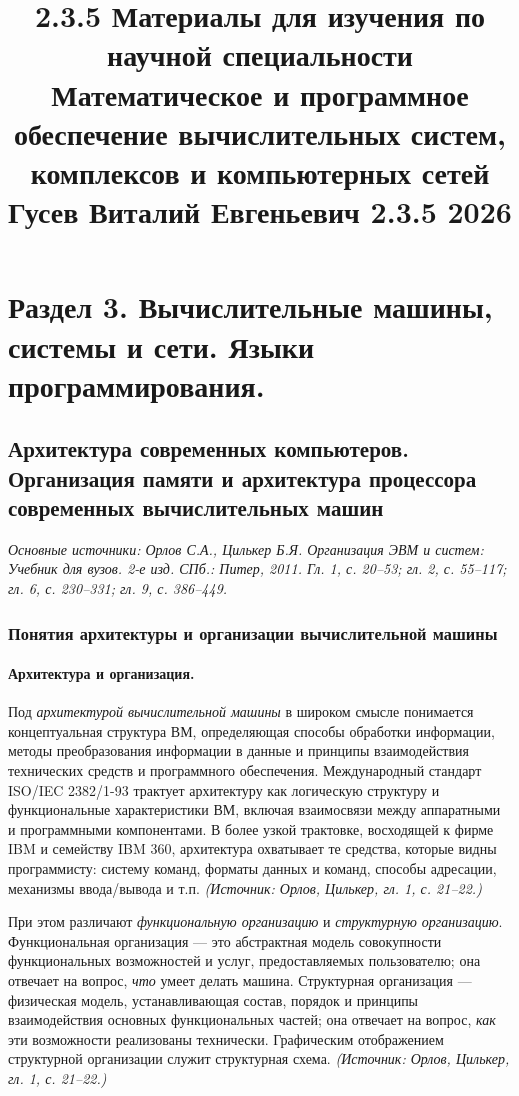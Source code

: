 \documentclass[a4paper,12pt]{article}
\title{2.3.5 Материалы для изучения по научной специальности \\
Математическое и программное обеспечение вычислительных систем, комплексов и компьютерных сетей \\
Гусев Виталий Евгеньевич 2.3.5 2026}
\date{}
\begin{document}
\maketitle

\tableofcontents
\newpage

\section{Раздел 3. Вычислительные машины, системы и сети. Языки программирования.}

\subsection{Архитектура современных компьютеров. Организация памяти и архитектура процессора современных вычислительных машин}

\noindent\textit{Основные источники: Орлов С.А., Цилькер Б.Я. Организация ЭВМ и систем: Учебник для вузов. 2-е изд. СПб.: Питер, 2011. Гл. 1, с. 20--53; гл. 2, с. 55--117; гл. 6, с. 230--331; гл. 9, с. 386--449.}

\subsubsection{Понятия архитектуры и организации вычислительной машины}

\paragraph{Архитектура и организация.}
Под \emph{архитектурой вычислительной машины} в широком смысле понимается концептуальная структура ВМ, определяющая способы обработки информации, методы преобразования информации в данные и принципы взаимодействия технических средств и программного обеспечения. Международный стандарт ISO/IEC 2382/1-93 трактует архитектуру как логическую структуру и функциональные характеристики ВМ, включая взаимосвязи между аппаратными и программными компонентами. В более узкой трактовке, восходящей к фирме IBM и семейству IBM 360, архитектура охватывает те средства, которые видны программисту: систему команд, форматы данных и команд, способы адресации, механизмы ввода/вывода и т.п.
\textit{(Источник: Орлов, Цилькер, гл. 1, с. 21--22.)}

При этом различают \emph{функциональную организацию} и \emph{структурную организацию}. Функциональная организация --- это абстрактная модель совокупности функциональных возможностей и услуг, предоставляемых пользователю; она отвечает на вопрос, \emph{что} умеет делать машина. Структурная организация --- физическая модель, устанавливающая состав, порядок и принципы взаимодействия основных функциональных частей; она отвечает на вопрос, \emph{как} эти возможности реализованы технически. Графическим отображением структурной организации служит структурная схема.
\textit{(Источник: Орлов, Цилькер, гл. 1, с. 21--22.)}
\end{document}
